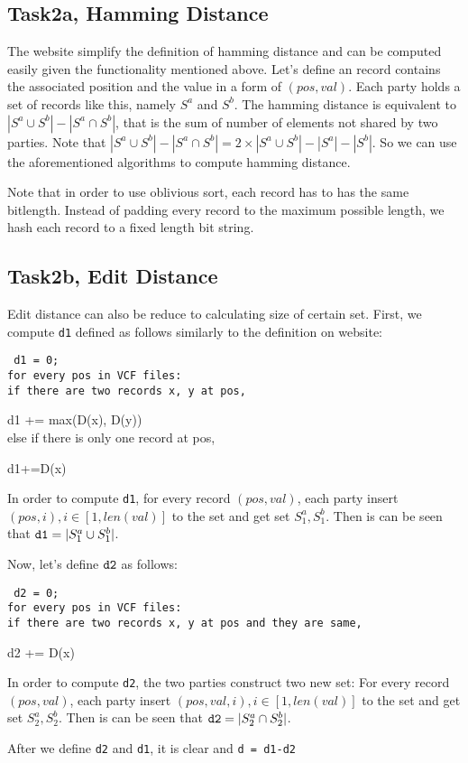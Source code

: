 \subsection{Task2a, Hamming Distance}
The website simplify the definition of hamming distance and can be computed easily given the functionality mentioned above.
Let's define an record contains the associated position and the value in a form of $(pos, val)$. Each party holds a set of records like this, namely 
$S^a$ and $S^b$. The hamming distance is equivalent to $|S^a\cup S^b| - |S^a\cap S^b|$, that is the sum of number of elements not shared by two parties.
Note that $|S^a\cup S^b| - |S^a\cap S^b| = 2\times|S^a\cup S^b|-|S^a| - |S^b|$. So we can use the aforementioned algorithms to compute hamming distance.

Note that in order to use oblivious sort, each record has to has the same bitlength. Instead of padding every record to the maximum possible length, we hash each
record to a fixed length bit string.
\subsection{Task2b, Edit Distance}
Edit distance can also be reduce to calculating size of certain set. First, we compute {\tt d1} defined as follows similarly to the definition on website:\\
{\tt
d1 = 0;\\
for every pos in VCF files:\\
if there are two records x, y at pos,

d1 += max(D(x), D(y))\\
else if there is only one record at pos,

d1+=D(x)\\}

In order to compute {\tt d1}, for every record $(pos, val)$, each party insert $(pos, i), i\in[1, len(val)]$ to the set and get set $S_1^a, S_1^b$. Then is 
can be seen that ${\tt d1} = |S_1^a\cup S_1^b|$.

Now, let's define ${\tt d2}$ as follows:
{\tt
d2 = 0;\\
for every pos in VCF files:\\
if there are two records x, y at pos and they are same,

d2 += D(x)\\}
In order to compute {\tt d2}, the two parties construct two new set: For every record $(pos, val)$, each party insert $(pos,val, i), i\in[1, len(val)]$ to the set and get set $S_2^a, S_2^b$. Then is 
can be seen that ${\tt d2} = |S_2^a\cap S_2^b|$.

After we define {\tt d2} and {\tt d1}, it is clear and {\tt d = d1-d2}